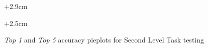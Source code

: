 \documentclass[12pt]{article}
\begin{document}
\begin{figure}[!tbp]
  \centering
  \begin{adjustwidth}{+2.9cm}{}
  \label{a}
  \end{adjustwidth}
  \hfill
  \begin{adjustwidth}{+2.5cm}{}
  \label{b}
  \end{adjustwidth}
    \captionsetup{justification   = centering}
    \caption{\textit{Top 1} and \textit{Top 5} accuracy pieplots for Second Level Task testing}
\label{pieplot}
\end{figure}
\end{document}
